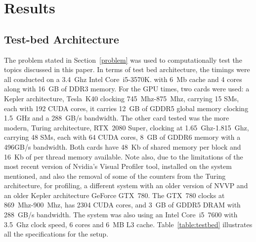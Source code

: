 \clearpage
\chapter{Results}

\section{Test-bed Architecture}

The problem stated in Section~\ref{problem} was used to computationally test the topics discussed in this paper. In terms of test bed architecture, the timings were all conducted on a 3.4~Ghz Intel Core~i5-3570K. with 6~Mb cache and 4 cores along with 16~GB of DDR3 memory. For the GPU times, two cards were used: a Kepler architecture, Tesla~K40 clocking 745~Mhz-875~Mhz, carrying 15 SMs, each with 192 CUDA cores, it carries 12~GB of GDDR5 global memory clocking 1.5~GHz and a 288~GB/s bandwidth. The other card tested was the more modern, Turing architecture, RTX~2080 Super, clocking at 1.65~Ghz-1.815~Ghz, carrying 48 SMs, each with 64 CUDA cores, 8~GB of GDDR6 memory with a 496GB/s bandwidth. Both cards have 48~Kb of shared memory per block and 16~Kb of per thread memory available. Note also, due to the limitations of the most recent version of Nvidia's Visual Profiler tool, installed on the system mentioned, and also the removal of some of the counters from the Turing architecture, for profiling, a different system with an older version of NVVP and an older Kepler architecture GeForce GTX~780. The GTX~780 clocks at 869~Mhz-900~Mhz, has 2304 CUDA cores, and 3~GB of GDDR5 DRAM with 288~GB/s bandwidth. The system was also using an Intel Core~i5~7600 with 3.5~Ghz clock speed, 6 cores and 6~MB L3 cache. Table~\ref{table:testbed} illustrates all the specifications for the setup.
\begin{table}
    \begin{center}
    \caption{Testbed architecture.}
	\label{table:testbed}
	\end{center}
\end{table}
    
